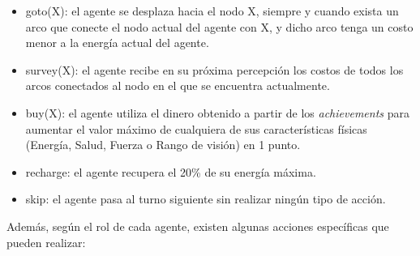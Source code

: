  \begin{itemize}
 
 \item goto(X): el agente se desplaza hacia el nodo X, siempre y cuando
 exista un arco que conecte el nodo actual del agente con X, y dicho
 arco tenga un costo menor a la energía actual del agente.
 
 \item survey(X): el agente recibe en su próxima percepción los costos
 de todos los arcos conectados al nodo en el que se encuentra
 actualmente.
 
 \item buy(X): el agente utiliza el dinero obtenido a partir de los
 \textit{achievements} para aumentar el valor máximo de cualquiera de
 sus características físicas (Energía, Salud, Fuerza o Rango de visión)
 en 1 punto.
 
 \item recharge: el agente recupera el 20\% de su energía máxima.
 
 \item skip: el agente pasa al turno siguiente sin realizar ningún tipo
 de acción.
 
 \end{itemize}
 
 Además, según el rol de cada agente, existen algunas acciones
 específicas que pueden realizar:
 
